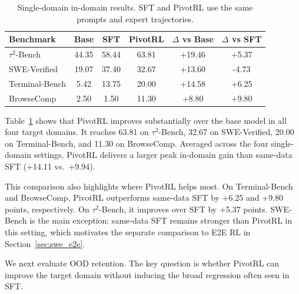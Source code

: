 \begin{table}[t]
\centering
\small
\begin{tabular}{lccccc}
\toprule
\textbf{Benchmark} & \textbf{Base} & \textbf{SFT} & \textbf{PivotRL} & \textbf{$\Delta$ vs Base} & \textbf{$\Delta$ vs SFT} \\
\midrule
$\tau^2$-Bench   & 44.35 & 58.44 & 63.81 & +19.46 & +5.37 \\
SWE-Verified     & 19.07 & 37.40 & 32.67 & +13.60 & -4.73 \\
Terminal-Bench   & 5.42  & 13.75 & 20.00 & +14.58 & +6.25 \\
BrowseComp       & 2.50  & 1.50  & 11.30 & +8.80  & +9.80 \\
\bottomrule
\end{tabular}
\caption{
Single-domain in-domain results.
SFT and PivotRL use the same prompts and expert trajectories.
}
\label{tab:single_domain_main_results}
\end{table}

Table~\ref{tab:single_domain_main_results} shows that PivotRL improves substantially over the base model in all four target domains. It reaches 63.81 on $\tau^2$-Bench, 32.67 on SWE-Verified, 20.00 on Terminal-Bench, and 11.30 on BrowseComp. Averaged across the four single-domain settings, PivotRL delivers a larger peak in-domain gain than same-data SFT (+14.11 vs.\ +9.94).

This comparison also highlights where PivotRL helps most. On Terminal-Bench and BrowseComp, PivotRL outperforms same-data SFT by +6.25 and +9.80 points, respectively. On $\tau^2$-Bench, it improves over SFT by +5.37 points. SWE-Bench is the main exception: same-data SFT remains stronger than PivotRL in this setting, which motivates the separate comparison to E2E RL in Section~\ref{sec:swe_e2e}.

We next evaluate OOD retention. The key question is whether PivotRL can improve the target domain without inducing the broad regression often seen in SFT.

